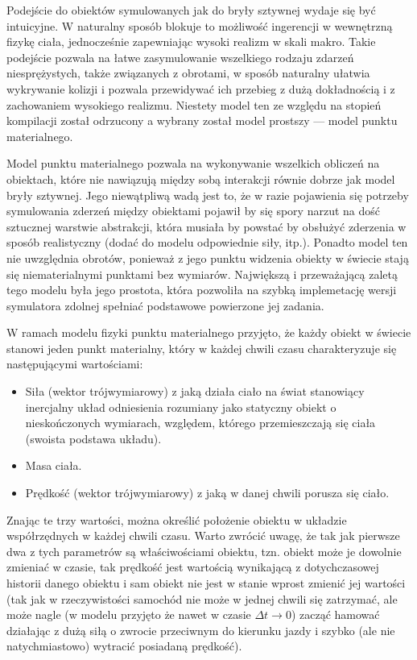 \par{
Podejście do obiektów symulowanych jak do bryły sztywnej wydaje się być intuicyjne. W naturalny sposób blokuje to możliwość ingerencji w wewnętrzną fizykę ciała, jednocześnie zapewniając wysoki realizm w skali makro.
Takie podejście pozwala na łatwe zasymulowanie wszelkiego rodzaju zdarzeń niesprężystych, także związanych z obrotami, w sposób naturalny ułatwia wykrywanie kolizji i pozwala przewidywać ich przebieg z dużą dokładnością i z zachowaniem wysokiego realizmu.
Niestety model ten ze względu na stopień kompilacji został odrzucony a wybrany został model prostszy --- model punktu materialnego.
\par{
Model punktu materialnego pozwala na wykonywanie wszelkich obliczeń na obiektach, które nie nawiązują między sobą interakcji równie dobrze jak model bryły sztywnej. Jego niewątpliwą wadą jest to, że w razie pojawienia się potrzeby symulowania zderzeń między obiektami pojawił by się spory narzut na dość sztucznej warstwie abstrakcji, która musiała by powstać by obsłużyć zderzenia w sposób realistyczny (dodać do modelu odpowiednie siły, itp.).
Ponadto model ten nie uwzględnia obrotów, ponieważ z jego punktu widzenia obiekty w świecie stają się niematerialnymi punktami bez wymiarów.
Największą i przeważającą zaletą tego modelu była jego prostota, która pozwoliła na szybką implemetację wersji symulatora zdolnej spełniać podstawowe powierzone jej zadania. 
}
\par{
W ramach modelu fizyki punktu materialnego przyjęto, że każdy obiekt w świecie stanowi jeden punkt materialny, który w każdej chwili czasu charakteryzuje się następującymi wartościami:
\begin{itemize}\renewcommand{\labelitemi}{$\bullet$}
\item Siła (wektor trójwymiarowy) z jaką działa ciało na świat stanowiący inercjalny układ odniesienia rozumiany jako statyczny obiekt o nieskończonych wymiarach, względem, którego przemieszczają się ciała (swoista podstawa układu).
\item Masa ciała.
\item Prędkość (wektor trójwymiarowy) z jaką w danej chwili porusza się ciało.
\end{itemize}
Znając te trzy wartości, można określić położenie obiektu w układzie współrzędnych w każdej chwili czasu.
Warto zwrócić uwagę, że tak jak pierwsze dwa z tych parametrów są właściwościami obiektu, tzn. obiekt może je dowolnie zmieniać w czasie, tak prędkość jest wartością wynikającą z dotychczasowej historii danego obiektu i sam obiekt nie jest w stanie wprost zmienić jej wartości (tak jak w rzeczywistości samochód nie może w jednej chwili się zatrzymać, ale może nagle (w modelu przyjęto że nawet w czasie $\Delta t \longrightarrow 0$) zacząć hamować działając z dużą siłą o zwrocie przeciwnym do kierunku jazdy i szybko (ale nie natychmiastowo) wytracić posiadaną prędkość).
}

}

